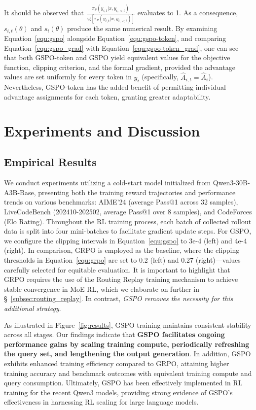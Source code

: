 It should be observed that $\frac{ \pi_{\theta} (y_{i,t} | x, y_{i,<t}) }{ \mathrm{sg} \left[ \pi_{\theta} (y_{i,t} | x, y_{i,<t}) \right] }$ evaluates to 1. As a consequence, $s_{i,t}(\theta)$ and $s_{i}(\theta)$ produce the same numerical result. By examining Equation~\eqref{equ:gspo} alongside Equation~\eqref{equ:gspo-token}, and comparing Equation~\eqref{equ:gspo_grad} with Equation~\eqref{equ:gspo-token_grad}, one can see that both GSPO-token and GSPO yield equivalent values for the objective function, clipping criterion, and the formal gradient, provided the advantage values are set uniformly for every token in $y_i$ (specifically, $\widehat{A}_{i,t} = \widehat{A}_{i}$). Nevertheless, GSPO-token has the added benefit of permitting individual advantage assignments for each token, granting greater adaptability.

\section{Experiments and Discussion}

\subsection{Empirical Results}

We conduct experiments utilizing a cold-start model initialized from Qwen3-30B-A3B-Base, presenting both the training reward trajectories and performance trends on various benchmarks: AIME'24 (average Pass@1 across 32 samples), LiveCodeBench (202410-202502, average Pass@1 over 8 samples), and CodeForces (Elo Rating). Throughout the RL training process, each batch of collected rollout data is split into four mini-batches to facilitate gradient update steps. For GSPO, we configure the clipping intervals in Equation~\eqref{equ:gspo} to 3e-4 (left) and 4e-4 (right). In comparison, GRPO is employed as the baseline, where the clipping thresholds in Equation~\eqref{equ:grpo} are set to 0.2 (left) and 0.27 (right)—values carefully selected for equitable evaluation. It is important to highlight that GRPO requires the use of the Routing Replay training mechanism to achieve stable convergence in MoE RL, which we elaborate on further in \S~\ref{subsec:routing_replay}. In contrast, \textit{GSPO removes the necessity for this additional strategy}.

As illustrated in Figure~\ref{fig:results}, GSPO training maintains consistent stability across all stages. Our findings indicate that \textbf{GSPO facilitates ongoing performance gains by scaling training compute, periodically refreshing the query set, and lengthening the output generation}. In addition, GSPO exhibits enhanced training efficiency compared to GRPO, attaining higher training accuracy and benchmark outcomes with equivalent training compute and query consumption. Ultimately, GSPO has been effectively implemented in RL training for the recent Qwen3 models, providing strong evidence of GSPO's effectiveness in harnessing RL scaling for large language models.


